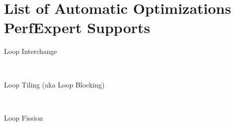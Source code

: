 \chapter{List of Automatic Optimizations PerfExpert Supports}\label{ch:automatic}

\begin{description}
  \item[Loop Interchange]\hfill \\
  \item[Loop Tiling (aka Loop Blocking)]\hfill \\
  \item[Loop Fission]\hfill \\
\end{description}
